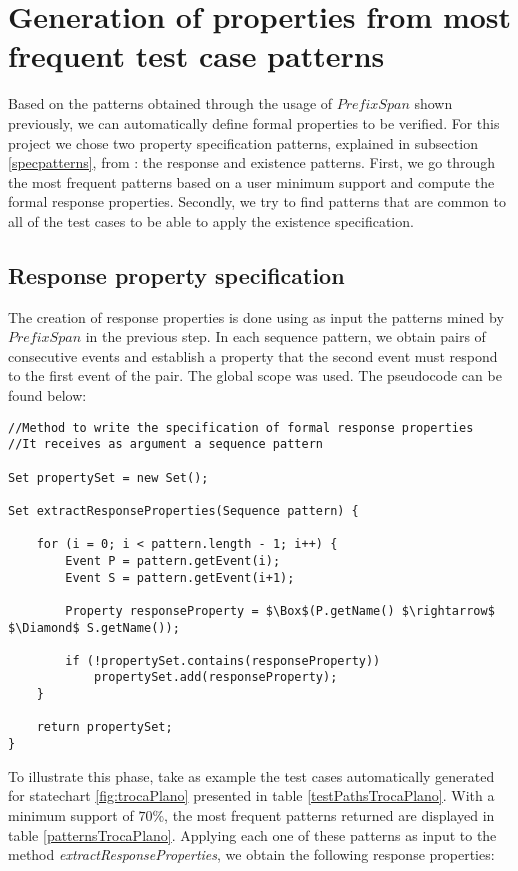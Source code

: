 \section{Generation of properties from most frequent test case patterns}
\label{genproppatterns}

Based on the patterns obtained through the usage of $PrefixSpan$ shown previously, we can automatically define formal properties to be verified. For this project we chose two property specification patterns, explained in subsection \ref{specpatterns}, from \cite{dwyer98}: the response and existence patterns. First, we go through the most frequent patterns based on a user minimum support and compute the formal response properties. Secondly, we  try to find patterns that are common to all of the test cases to be able to apply the existence specification.

\subsection{Response property specification}
\label{responseSpec}

The creation of response properties is done using as input the patterns mined by $PrefixSpan$ in the previous step. In each sequence pattern, we obtain pairs of consecutive events and establish a property that the second event must respond to the first event of the pair. The global scope was used. The pseudocode can be found below:

\begin{lstlisting}[mathescape]
//Method to write the specification of formal response properties
//It receives as argument a sequence pattern 

Set propertySet = new Set();

Set extractResponseProperties(Sequence pattern) {

	for (i = 0; i < pattern.length - 1; i++) {
		Event P = pattern.getEvent(i);
		Event S = pattern.getEvent(i+1);

		Property responseProperty = $\Box$(P.getName() $\rightarrow$ $\Diamond$ S.getName());

		if (!propertySet.contains(responseProperty))
			propertySet.add(responseProperty);
	}

	return propertySet;
}
\end{lstlisting}

To illustrate this phase, take as example the test cases automatically generated for statechart \ref{fig:trocaPlano} presented in table \ref{testPathsTrocaPlano}. With a minimum support of $70\%$, the most frequent patterns returned are displayed in table \ref{patternsTrocaPlano}. Applying each one of these patterns as input to the method \textit{extractResponseProperties}, we obtain the following response properties:

